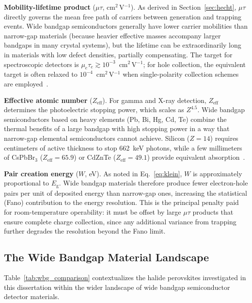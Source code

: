 \textbf{Mobility-lifetime product} ($\mu\tau$, cm$^2$\,V$^{-1}$).
As derived in Section~\ref{sec:hecht}, $\mu\tau$ directly governs
the mean free path of carriers between generation and trapping events.
Wide bandgap semiconductors generally have lower carrier mobilities
than narrow-gap materials (because heavier effective masses accompany
larger bandgaps in many crystal systems), but the lifetime can be
extraordinarily long in materials with low defect densities, partially
compensating.  The target for spectroscopic detectors is
$\mu_e\tau_e \gtrsim 10^{-3}$~cm$^2$\,V$^{-1}$; for hole collection,
the equivalent target is often relaxed to $10^{-4}$~cm$^2$\,V$^{-1}$
when single-polarity collection schemes are employed~\cite{Luke1995}.

\textbf{Effective atomic number} ($Z_{\mathrm{eff}}$).  For gamma and X-ray
detection, $Z_{\mathrm{eff}}$ determines the photoelectric stopping power,
which scales as $Z^{4.5}$.  Wide bandgap semiconductors based on
heavy elements (Pb, Bi, Hg, Cd, Te) combine the thermal benefits of
a large bandgap with high stopping power in a way that narrow-gap
elemental semiconductors cannot achieve.  Silicon ($Z = 14$) requires
centimeters of active thickness to stop 662~keV photons, while a few
millimeters of CsPbBr$_3$ ($Z_{\mathrm{eff}} = 65.9$) or CdZnTe
($Z_{\mathrm{eff}} = 49.1$) provide equivalent absorption~\cite{Murty1965}.

\textbf{Pair creation energy} ($W$, eV).  As noted in
Eq.~\ref{eq:klein}, $W$ is approximately proportional to $E_{\mathrm{g}}$.
Wide bandgap materials therefore produce fewer electron-hole pairs per
unit of deposited energy than narrow-gap ones, increasing the
statistical (Fano) contribution to the energy resolution.  This is the
principal penalty paid for room-temperature operability: it must be
offset by large $\mu\tau$ products that ensure complete charge
collection, since any additional variance from trapping further
degrades the resolution beyond the Fano limit.

\subsection{The Wide Bandgap Material Landscape}

Table~\ref{tab:wbg_comparison} contextualizes the halide perovskites
investigated in this dissertation within the wider landscape of wide
bandgap semiconductor detector materials.

